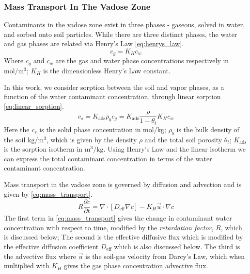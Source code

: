 \subsubsection{Mass Transport In The Vadose Zone}\label{sec:mass_transport}

Contaminants in the vadose zone exist in three phases - gaseous, solved in water, and sorbed onto soil particles.
While there are three distinct phases, the water and gas phases are related via Henry's Law \eqref{eq:henrys_law}.
\begin{equation}\label{eq:henrys_law}
  c_g = K_H c_w
\end{equation}
Where $c_g$ and $c_w$ are the gas and water phase concentrations respectively in $\mathrm{mol/m^3}$;
$K_H$ is the dimensionless Henry's Law constant.\par

In this work, we consider sorption between the soil and vapor phases, as a function of the water contaminant concentration, through linear sorption \eqref{eq:linear_sorption}.
\begin{equation}\label{eq:linear_sorption}
  c_s = K_\mathrm{ads} \rho_b c_g = K_\mathrm{ads} \frac{\rho}{1-\theta_t} K_H c_w
\end{equation}
Here the $c_s$ is the solid phase concentration in $\mathrm{mol/kg}$;
$\rho_b$ is the bulk density of the soil $\mathrm{kg/m^3}$, which is given by the density $\rho$ and the total soil porosity $\theta_t$;
$K_\mathrm{ads}$ is the sorption isotherm in $\mathrm{m^3/kg}$.
Using Henry's Law and the linear isotherm we can express the total contaminant concentration in terms of the water contaminant concentration.\par

Mass transport in the vadose zone is governed by diffusion and advection and is given by \eqref{eq:mass_transport}.
\begin{equation}\label{eq:mass_transport}
  R \frac{\partial c}{\partial t} =
    \nabla \cdot[ D_\mathrm{eff} \nabla c] -
    K_H \vec{u} \cdot \nabla c
\end{equation}
The first term in \eqref{eq:mass_transport} gives the change in contaminant water concentration with respect to time, modified by the \textit{retardation factor}, $R$, which is discussed below;
The second is the effective diffusive flux which is modified by the effective diffusion coefficient $D_\mathrm{eff}$ which is also discussed below.
The third is the advective flux where $\vec{u}$ is the soil-gas velocity from Darcy's Law, which when multiplied with $K_H$ gives the gas phase concentration advective flux.\par

